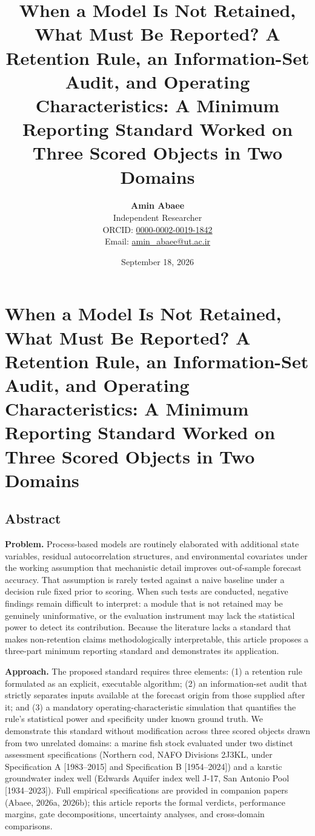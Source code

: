 \documentclass[11pt]{article}
\title{When a Model Is Not Retained, What Must Be Reported? A Retention Rule, an Information-Set Audit, and Operating Characteristics: A Minimum Reporting Standard Worked on Three Scored Objects in Two Domains}
\author{\textbf{Amin Abaee}\\ Independent Researcher\\[2pt] ORCID: \href{https://orcid.org/0000-0002-0019-1842}{0000-0002-0019-1842}\\ Email: \href{mailto:amin_abaee@ut.ac.ir}{amin_abaee@ut.ac.ir}}
\date{September 18, 2026}
\begin{document}
\maketitle

\section{When a Model Is Not Retained, What Must Be Reported? A
Retention Rule, an Information-Set Audit, and Operating Characteristics:
A Minimum Reporting Standard Worked on Three Scored Objects in Two
Domains}\label{when-a-model-is-not-retained-what-must-be-reported-a-retention-rule-an-information-set-audit-and-operating-characteristics-a-minimum-reporting-standard-worked-on-three-scored-objects-in-two-domains}

\subsection{Abstract}\label{abstract}

\textbf{Problem.} Process-based models are routinely elaborated with
additional state variables, residual autocorrelation structures, and
environmental covariates under the working assumption that mechanistic
detail improves out-of-sample forecast accuracy. That assumption is
rarely tested against a naive baseline under a decision rule fixed prior
to scoring. When such tests are conducted, negative findings remain
difficult to interpret: a module that is not retained may be genuinely
uninformative, or the evaluation instrument may lack the statistical
power to detect its contribution. Because the literature lacks a
standard that makes non-retention claims methodologically interpretable,
this article proposes a three-part minimum reporting standard and
demonstrates its application.

\textbf{Approach.} The proposed standard requires three elements: (1) a
retention rule formulated as an explicit, executable algorithm; (2) an
information-set audit that strictly separates inputs available at the
forecast origin from those supplied after it; and (3) a mandatory
operating-characteristic simulation that quantifies the rule's
statistical power and specificity under known ground truth. We
demonstrate this standard without modification across three scored
objects drawn from two unrelated domains: a marine fish stock evaluated
under two distinct assessment specifications (Northern cod, NAFO
Divisions 2J3KL, under Specification A {[}1983--2015{]} and
Specification B {[}1954--2024{]}) and a karstic groundwater index well
(Edwards Aquifer index well J-17, San Antonio Pool {[}1934--2023{]}).
Full empirical specifications are provided in companion papers (Abaee,
2026a, 2026b); this article reports the formal verdicts, performance
margins, gate decompositions, uncertainty analyses, and cross-domain
comparisons.
\end{document}
